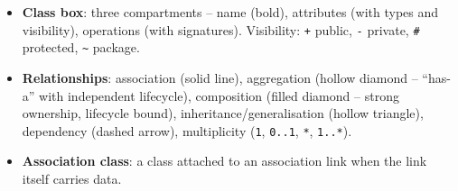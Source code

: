 \begin{itemize}
    \item \textbf{Class box}: three compartments -- name (bold), attributes (with types and visibility), operations (with signatures). Visibility: \texttt{+} public, \texttt{-} private, \texttt{\#} protected, \texttt{\textasciitilde} package.
    \item \textbf{Relationships}: association (solid line), aggregation (hollow diamond -- ``has-a'' with independent lifecycle), composition (filled diamond -- strong ownership, lifecycle bound), inheritance/generalisation (hollow triangle), dependency (dashed arrow), multiplicity (\texttt{1}, \texttt{0..1}, \texttt{*}, \texttt{1..*}).
    \item \textbf{Association class}: a class attached to an association link when the link itself carries data.
\end{itemize}

